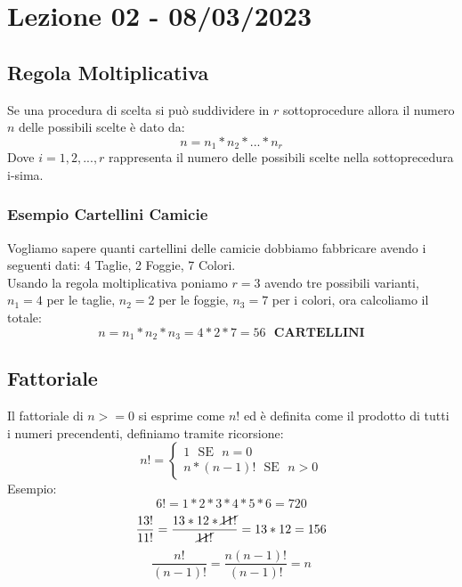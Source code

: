 \section{Lezione 02 - 08/03/2023}

\subsection{Regola Moltiplicativa}
Se una procedura di scelta si può suddividere in $r$ sottoprocedure allora il numero $n$ delle possibili scelte è dato da:
$$ n = n_1*n_2*...*n_r$$
Dove $i=1,2,...,r$ rappresenta il numero delle possibili scelte nella sottoprecedura i-sima.\\
\subsubsection{Esempio Cartellini Camicie}
Vogliamo sapere quanti cartellini delle camicie dobbiamo fabbricare avendo i seguenti dati:
4 Taglie, 2 Foggie, 7 Colori.\\
Usando la regola moltiplicativa poniamo $r=3$ avendo tre possibili varianti, $n_1=4$ per le taglie, $n_2=2$ per le foggie, $n_3=7$ per i colori, ora calcoliamo il totale:
$$ n = n_1*n_2*n_3 = 4*2*7 = 56 \:\:\: \textbf{CARTELLINI} $$

\subsection{Fattoriale}
Il fattoriale di $n>=0$ si esprime come $n!$ ed è definita come il prodotto di tutti i numeri precendenti, definiamo tramite ricorsione:
\begin{equation*}
n! = 
\begin{cases}
1 \: \: \: \text{SE} \: \: \: n=0\\
n*(n-1)! \: \: \: \text{SE} \: \: \: n>0
\end{cases}
\end{equation*}
Esempio: 
$$6! = 1*2*3*4*5*6 = 720$$
$$ \frac{13!}{11!} = \frac{13*12*\cancel{11!}}{\cancel{11!}} = 13*12 = 156 $$
$$ \frac{n!}{(n-1)!} = \frac{n(n-1)!}{(n-1)!} = n $$
\newpage

